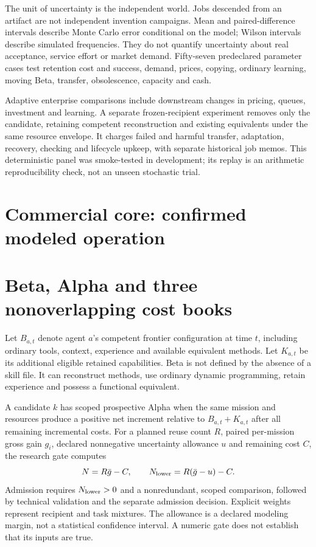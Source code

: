 \documentclass[11pt,letterpaper]{article}
\begin{document}
The unit of uncertainty is the independent world. Jobs descended from an artifact
are not independent invention campaigns. Mean and paired-difference intervals
describe Monte Carlo error conditional on the model; Wilson intervals describe
simulated frequencies. They do not quantify uncertainty about real acceptance,
service effort or market demand. Fifty-seven predeclared parameter cases test
retention cost and success, demand, prices, copying, ordinary learning, moving
Beta, transfer, obsolescence, capacity and cash.

Adaptive enterprise comparisons include downstream changes in pricing, queues,
investment and learning. A separate frozen-recipient experiment removes only
the candidate, retaining competent reconstruction and existing equivalents under
the same resource envelope. It charges failed and harmful transfer, adaptation,
recovery, checking and lifecycle upkeep, with separate historical job memos.
This deterministic panel was smoke-tested in development; its replay is an
arithmetic reproducibility check, not an unseen stochastic trial.

\section{Commercial core: confirmed modeled operation}


\section{Beta, Alpha and three nonoverlapping cost books}

Let $B_{a,t}$ denote agent $a$'s competent frontier configuration at time $t$,
including ordinary tools, context, experience and available equivalent methods.
Let $K_{a,t}$ be its additional eligible retained capabilities. Beta is not
defined by the absence of a skill file. It can reconstruct methods, use ordinary
dynamic programming, retain experience and possess a functional equivalent.

A candidate $k$ has scoped prospective Alpha when the same mission and resources
produce a positive net increment relative to $B_{a,t}+K_{a,t}$ after all remaining
incremental costs. For a planned reuse count $R$, paired per-mission gross gain
$g_i$, declared nonnegative uncertainty allowance $u$ and remaining cost $C$, the
research gate computes
\begin{equation}
N=R\bar g-C,\qquad N_{\rm lower}=R(\bar g-u)-C.
\label{eq:alpha}
\end{equation}
Admission requires $N_{\rm lower}>0$ and a nonredundant, scoped comparison, followed
by technical validation and the separate admission decision. Explicit weights
represent recipient and task mixtures. The allowance is a declared modeling
margin, not a statistical confidence interval. A numeric gate does not establish
that its inputs are true.
\end{document}
